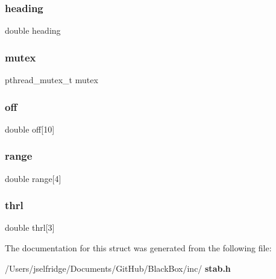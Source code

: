 \mbox{\label{structstab__struct_ae024163074f229a06b7ea69b190e466d}} 
\subsubsection{heading}
{\footnotesize\ttfamily double heading}

\mbox{\label{structstab__struct_a4acff8232e4aec9cd5c6dc200ac55ef3}} 
\subsubsection{mutex}
{\footnotesize\ttfamily pthread\+\_\+mutex\+\_\+t mutex}

\mbox{\label{structstab__struct_ad41eb87b528b76c0100b70bc2175262a}} 
\subsubsection{off}
{\footnotesize\ttfamily double off[10]}

\mbox{\label{structstab__struct_a558f234ec881e648bbce13b2f6fba1c6}} 
\subsubsection{range}
{\footnotesize\ttfamily double range[4]}

\mbox{\label{structstab__struct_a019302c114428d4fb61dbfdef2151e05}} 
\subsubsection{thrl}
{\footnotesize\ttfamily double thrl[3]}



The documentation for this struct was generated from the following file\+:\begin{DoxyCompactItemize}
\item 
/\+Users/jselfridge/\+Documents/\+Git\+Hub/\+Black\+Box/inc/\textbf{ stab.\+h}\end{DoxyCompactItemize}
